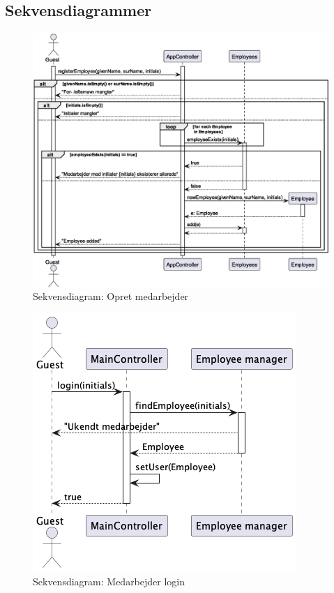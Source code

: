 \subsection{Sekvensdiagrammer}\label{sec:sequence}
\begin{figure}[H]
    \centering
    \caption{Sekvensdiagram: Opret medarbejder}\label{fig:sequenceRegisterEmployee}
    \includegraphics[width = .75\textwidth]{Diagrams/seq_registerEmployee.eps}
\end{figure}
\begin{figure}[H]
    \centering
    \caption{Sekvensdiagram: Medarbejder login}\label{fig:sequence_login}
    \includegraphics[width = .45\textwidth]{Diagrams/seq_login.png}
\end{figure}
